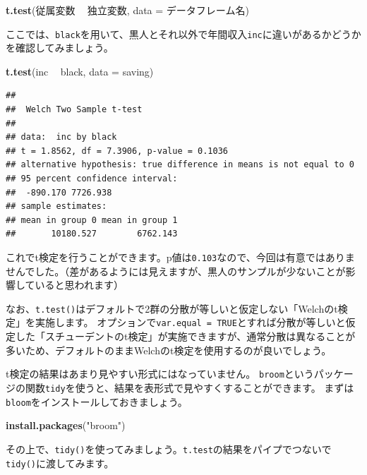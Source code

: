 \documentclass[]{book}
\newenvironment{Shaded}{\begin{snugshade}}{\end{snugshade}}
\newcommand{\KeywordTok}[1]{\textcolor[rgb]{0.13,0.29,0.53}{\textbf{#1}}}
\newcommand{\DataTypeTok}[1]{\textcolor[rgb]{0.13,0.29,0.53}{#1}}
\newcommand{\StringTok}[1]{\textcolor[rgb]{0.31,0.60,0.02}{#1}}
\newcommand{\OperatorTok}[1]{\textcolor[rgb]{0.81,0.36,0.00}{\textbf{#1}}}
\newcommand{\NormalTok}[1]{#1}
\begin{document}
\begin{Shaded}
\begin{Highlighting}[]
\KeywordTok{t.test}\NormalTok{(従属変数 }\OperatorTok{~}\StringTok{ }\NormalTok{独立変数, }\DataTypeTok{data =}\NormalTok{ データフレーム名)}
\end{Highlighting}
\end{Shaded}

ここでは、\texttt{black}を用いて、黒人とそれ以外で年間収入\texttt{inc}に違いがあるかどうかを確認してみましょう。

\begin{Shaded}
\begin{Highlighting}[]
\KeywordTok{t.test}\NormalTok{(inc }\OperatorTok{~}\StringTok{ }\NormalTok{black, }\DataTypeTok{data =}\NormalTok{ saving)}
\end{Highlighting}
\end{Shaded}

\begin{verbatim}
## 
##  Welch Two Sample t-test
## 
## data:  inc by black
## t = 1.8562, df = 7.3906, p-value = 0.1036
## alternative hypothesis: true difference in means is not equal to 0
## 95 percent confidence interval:
##  -890.170 7726.938
## sample estimates:
## mean in group 0 mean in group 1 
##       10180.527        6762.143
\end{verbatim}

これでt検定を行うことができます。p値は\texttt{0.103}なので、今回は有意ではありませんでした。（差があるようには見えますが、黒人のサンプルが少ないことが影響していると思われます）

なお、\texttt{t.test()}はデフォルトで2群の分散が等しいと仮定しない「Welchのt検定」を実施します。
オプションで\texttt{var.equal\ =\ TRUE}とすれば分散が等しいと仮定した「スチューデントのt検定」が実施できますが、通常分散は異なることが多いため、デフォルトのままWelchのt検定を使用するのが良いでしょう。

t検定の結果はあまり見やすい形式にはなっていません。
\texttt{broom}というパッケージの関数\texttt{tidy}を使うと、結果を表形式で見やすくすることができます。
まずは\texttt{bloom}をインストールしておきましょう。

\begin{Shaded}
\begin{Highlighting}[]
\KeywordTok{install.packages}\NormalTok{(}\StringTok{"broom"}\NormalTok{)}
\end{Highlighting}
\end{Shaded}

その上で、\texttt{tidy()}を使ってみましょう。\texttt{t.test}の結果をパイプでつないで\texttt{tidy()}に渡してみます。
\end{document}
